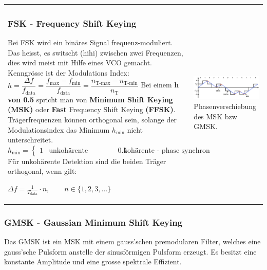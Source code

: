 \begin{tabular}{ll}
	\parbox{9cm}{
		\subsubsection{FSK - Frequency Shift Keying }
		Bei FSK wird ein binäres Signal frequenz-moduliert. Das heisst,
		es switscht (hihi) zwischen zwei Frequenzen, dies wird meist mit Hilfe eines
		VCO gemacht.\\
		Kenngrösse ist der Modulations Index: \\
		$h=\dfrac{\Delta f}{f_{\text{data}}}=\dfrac{f_{\text{max}} -
		f_{\text{min}}}{f_{\text{data}}} =\dfrac{n_{\text{T-max}} -
		n_{\text{T-min}}}{n_\text{T}}$ \\ Bei einem \textbf{h von 0.5 }spricht man von
		\textbf{Minimum Shift Keying (MSK)} oder \textbf{Fast} Frequency Shift Keying
		\textbf{(FFSK)}. Trägerfrequenzen können orthogonal sein, solange der
		Modulationsindex das Minimum $h_{\text{min}}$ nicht unterschreitet. \\ $h_{\text{min}} =
		\begin{cases} 1   & \text{unkohärente Detektion} \\                                
                                0.5   & \text{kohärente - phase
                                synchron - Detektion} \end{cases}$\\
        Für unkohärente Detektion sind die beiden Träger orthogonal, wenn gilt:
        \\
        $    \Delta f = \frac{1}{T_{\text{data}}} \cdot n , \qquad n \in \lbrace
        1, 2, 3, \ldots \rbrace $
	}
	&\parbox{9cm}{
	\includegraphics[width=9cm]{./bilder/modulation_phasenverschiebungGMSK_MSK.png}\\
	Phasenverschiebung des MSK bzw GMSK. }
\end{tabular}
     
        
\subsubsection{GMSK - Gaussian Minimum Shift Keying }
Das GMSK ist ein MSK mit einem gauss'schen premodularen Filter, welches eine gauss'sche Pulsform
anstelle der sinusförmigen Pulsform erzeugt. Es besitzt eine
konstante Amplitude und eine grosse spektrale Effizient. 

